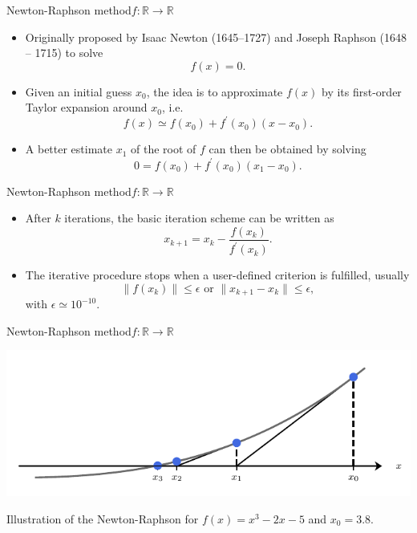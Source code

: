 \documentclass[usenames,dvipsnames,svgnames,10pt,aspectratio=169]{beamer}
\begin{document}
\begin{frame}[t, c]{Newton-Raphson method}{$f : \mathbb{R} \to \mathbb{R}$}
	\begin{itemize}
		\item Originally proposed by Isaac Newton (1645--1727) and Joseph Raphson (1648 -- 1715) to solve
		$$f(x) = 0.$$

		\medskip

		\item Given an initial guess $x_0$, the idea is to approximate $f(x)$ by its first-order Taylor expansion around $x_0$, i.e.\
		$$
		f(x) \simeq f(x_0) + f^{\prime}(x_0) ( x - x_0).
		$$

		\medskip

		\item A better estimate $x_1$ of the root of $f$ can then be obtained by solving
		$$
		0 = f(x_0) + f^{\prime}(x_0) ( x_1 - x_0).
		$$
	\end{itemize}

	\vspace{1cm}
\end{frame}

\begin{frame}[t, c]{Newton-Raphson method}{$f : \mathbb{R} \to \mathbb{R}$}
	\begin{itemize}
		\item After $k$ iterations, the basic iteration scheme can be written as
		$$
		x_{k+1} = x_k - \displaystyle \frac{f(x_k)}{f^{\prime}(x_k)}.
		$$

		\bigskip

		\item The iterative procedure stops when a user-defined criterion is fulfilled, usually
		$$
		\| f(x_k) \| \le \epsilon \text{ or } \| x_{k+1} - x_k \| \le \epsilon,
		$$
		with $\epsilon \simeq 10^{-10}$.
	\end{itemize}

	\vspace{1cm}
\end{frame}


\begin{frame}[t, c]{Newton-Raphson method}{$f : \mathbb{R} \to \mathbb{R}$}
	\centering

	\includegraphics[width=.75\textwidth]{Newton_method}

	\bigskip

	Illustration of the Newton-Raphson for $f(x) = x^3 - 2x - 5$ and $x_0=3.8$.

	\vspace{1cm}
\end{frame}
\end{document}
